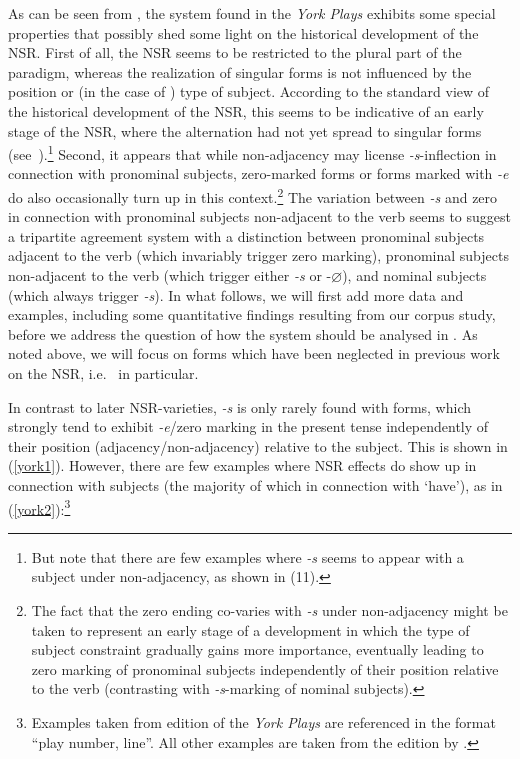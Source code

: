 \documentclass[output=paper]{langsci/langscibook}
\begin{document}
As can be seen from , the  system found in the \emph{York
Plays} exhibits some special properties that possibly shed some light on the
historical development of the \gls{NSR}. First of all, the \gls{NSR} seems to
be restricted to the plural part of the paradigm, whereas the realization of
singular forms is not influenced by the position or (in the case of \Tsg{})
type of subject. According to the standard view of the historical development
of the \gls{NSR}, this seems to be indicative of an
early stage of the \gls{NSR}, where the  alternation had not yet
spread to singular forms (see~).\footnote{But note that there
    are few examples where \emph{-s} seems to appear with a \Fsg{} subject
    under non-adjacency, as shown in (11).} Second, it appears that while
    non-adjacency may license \emph{-s}-inflection in connection with
    pronominal subjects, zero-marked forms or forms marked with \emph{-e} do
    also occasionally turn up in this context.\footnote{The fact that the zero
        ending co-varies with \emph{-s} under non-adjacency might be taken to
        represent an early stage of a development in which the type of subject
        constraint gradually gains more importance, eventually leading to zero
    marking of pronominal subjects independently of their position relative to
the verb (contrasting with \emph{-s}-marking of nominal subjects).} The
variation between \emph{-s} and zero in connection with pronominal subjects
non-adjacent to the verb seems to suggest a tripartite agreement system with a
distinction between pronominal subjects adjacent to the verb (which invariably
trigger zero marking), pronominal subjects non-adjacent to the verb (which
trigger either \emph{-s} or -$\varnothing$), and nominal subjects (which always
trigger \emph{-s}). In what follows, we will first add more data and examples,
including some quantitative findings resulting from our corpus study, before we
address the question of how the  system should be analysed in
. As noted above, we will focus on forms which
have been neglected in previous work on the \gls{NSR}, i.e.\ \Ssg{} in particular.

In contrast to later \gls{NSR}-varieties, \emph{-s} is only rarely found with
\Fsg{} forms, which strongly tend to exhibit \emph{-e}/zero marking in the
present tense independently of their position (adjacency/non-adjacency)
relative to the subject. This is shown in (\ref{york1}). However, there are few
examples where \gls{NSR} effects do show up in
connection with \Fsg{} subjects (the majority of which in connection with
`have'), as in (\ref{york2}):\footnote{Examples taken from
     edition of the \emph{York Plays} are referenced in
the format ``play number, line''. All other examples are taken from the edition
by \textcite{Beadle:1982}.}
\end{document}
